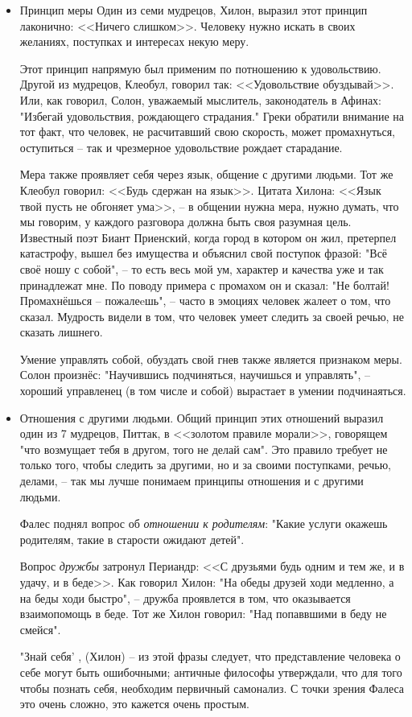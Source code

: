 \documentclass[a4paper, 12pt]{article} %
\begin{document}
\begin{itemize}
\item Принцип меры 
Один из семи мудрецов, Хилон, выразил этот принцип лаконично: <<Ничего слишком>>. Человеку нужно искать в своих желаниях, поступках и интересах некую меру.

Этот принцип напрямую был применим по потношению к удовольствию. Другой из мудрецов, Клеобул, говорил так: <<Удовольствие обуздывай>>. Или, как говорил, Солон, уважаемый мыслитель, законодатель в Афинах: "Избегай удовольствия, рождающего страдания." Греки обратили внимание на тот факт, что человек, не расчитавший свою скорость, может промахнуться, оступиться -- так и чрезмерное удовольствие рождает старадание.

Мера также проявляет себя через язык, общение с другими людьми. Тот же Клеобул говорил: <<Будь сдержан на язык>>. Цитата Хилона: <<Язык твой пусть не обгоняет ума>>, -- в общении нужна мера, нужно думать, что мы говорим, у каждого разговора должна быть своя разумная цель. Известный поэт Биант Приенский, когда город в котором он жил, претерпел катастрофу, вышел без имущества и объяснил свой поступок фразой: "Всё своё ношу с собой", -- то есть весь мой ум, характер и качества уже и так принадлежат мне. По поводу примера с промахом он и сказал: "Не болтай! Промахнёшься -- пожалеeшь", -- часто в эмоциях человек жалеет о том, что сказал. Мудрость видели в том, что человек умеет следить за своей речью, не сказать лишнего.

Умение управлять собой, обуздать свой гнев также является признаком меры. Солон произнёс: "Научившись подчиняться, научишься и управлять", -- хороший управленец (в том числе и собой) вырастает в умении подчинаяться.

\item Отношения с другими людьми. Общий принцип этих отношений выразил один из 7 мудрецов, Питтак, в <<золотом правиле морали>>, говорящем "что возмущает тебя в другом, того не делай сам". Это правило требует не только того, чтобы следить за другими, но и за своими поступками, речью, делами, -- так мы лучше понимаем принципы отношения и с другими людьми.

Фалес поднял вопрос об \textit{отношении к родителям}: "Какие услуги окажешь родителям, такие в старости ожидают детей".

Вопрос \textit{дружбы} затронул Периандр: <<С друзьями будь одним и тем же, и в удачу, и в беде>>. Как говорил Хилон: "На обеды друзей ходи медленно, а на беды ходи быстро", -- дружба проявлется в том, что оказывается взаимопомощь в беде. Тот же Хилон говорил: "Над попаввшими в беду не смейся".

"Знай себя' , (Хилон) -- из этой фразы следует, что представление человека о себе могут быть ошибочными; античные философы утверждали, что для того чтобы познать себя, необходим первичный самонализ. С точки зрения Фалеса это очень сложно, это кажется очень простым.

\end{itemize}
\end{document}
